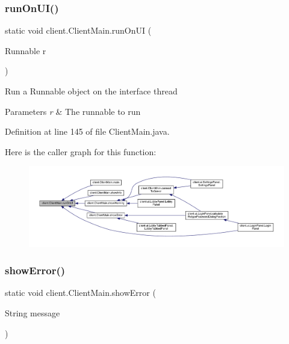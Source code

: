 \subsubsection{\texorpdfstring{run\+On\+U\+I()}{runOnUI()}}
{\footnotesize\ttfamily static void client.\+Client\+Main.\+run\+On\+UI (\begin{DoxyParamCaption}\item[{Runnable}]{r }\end{DoxyParamCaption})\hspace{0.3cm}{\ttfamily [static]}}

Run a Runnable object on the interface thread


\begin{DoxyParams}{Parameters}
{\em r} & The runnable to run \\
\hline
\end{DoxyParams}


Definition at line 145 of file Client\+Main.\+java.

Here is the caller graph for this function\+:
\nopagebreak
\begin{figure}[H]
\begin{center}
\leavevmode
\includegraphics[width=350pt]{classclient_1_1_client_main_ad1c0bf16363beb967cc1a7a9a41a4e21_icgraph}
\end{center}
\end{figure}
\hypertarget{classclient_1_1_client_main_ab814569831a92249ded3d7258c0ac929}{}\label{classclient_1_1_client_main_ab814569831a92249ded3d7258c0ac929} 
\subsubsection{\texorpdfstring{show\+Error()}{showError()}}
{\footnotesize\ttfamily static void client.\+Client\+Main.\+show\+Error (\begin{DoxyParamCaption}\item[{String}]{message }\end{DoxyParamCaption})\hspace{0.3cm}{\ttfamily [static]}}

